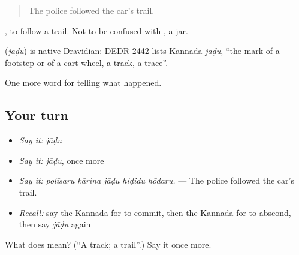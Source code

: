 \begin{quote}
The police followed the car's trail.
\end{quote}

 , to follow a trail. Not to be confused with , a jar.

\begin{cousinweb}
\textbf{} (\emph{jāḍu}) is native Dravidian: DEDR 2442 lists Kannada \emph{jāḍu}, \textquotedblleft{}the mark of a footstep or of a cart wheel, a track, a trace\textquotedblright{}.
\end{cousinweb}

\begin{grammarlens}[title={What you've built}]
One more word for telling what happened.
\end{grammarlens}

\subsection*{Your turn}
\begin{itemize}
\raggedright
  \item \emph{Say it:} \emph{jāḍu}
  \item \emph{Say it:} \emph{jāḍu}, once more
  \item \emph{Say it:} \emph{polīsaru kārina jāḍu hiḍidu hōdaru.} — The police followed the car's trail.
  \item \emph{Recall:} say the Kannada for to commit, then the Kannada for to abscond, then say \emph{jāḍu} again
\end{itemize}

\begin{tcolorbox}[breakable,colback=teal!4,colframe=teal!35!black,title={Before you move on}]
What does  mean? (\textquotedblleft{}A track; a trail\textquotedblright{}.) Say it once more.
\end{tcolorbox}
